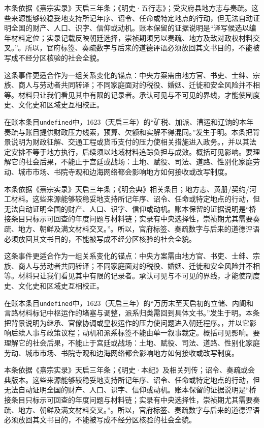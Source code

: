 本条依据《熹宗实录》天启三年条；《明史·五行志》；受灾府县地方志与奏疏。这些来源能够较稳妥地支持所记年序、诏令、任命或特定地点的行动，但无法自动证明全国的财产、人口、识字、信仰或动机。账本保留的证据说明是“译写候选以编年材料定位；实录记载反映朝廷选择，崇祯期须另以奏疏、地方及敌对政权材料交叉。”。所以，官府标签、奏疏数字与后来的道德评语必须放回其文书目的，不能被写成不经分区核验的社会全貌。

这条事件更适合作为一组关系变化的锚点：中央方案需由地方官、书吏、士绅、宗族、商人与劳动者共同转译；不同家庭面对的税役、婚姻、迁徙和安全风险并不相等。材料只让我们看见其中有限的记录者。承认可见与不可见的界线，才能使制度史、文化史和区域史互相校正。

在账本条目\texttt{undefined}中，1623（天启三年）的“矿税、加派、漕运和辽饷的本年奏疏与账目提供财政压力线索，预算、欠额和实解不得混同。”发生于明。本条把背景说明为财政征解、交通工程或货币支付的压力使相关措施进入政务。，并以其法定安排不等于地方执行，后续须以地域材料追踪负担与成效。概括可见影响。要理解它的社会后果，不能止于宫廷或战场：土地、赋役、司法、道路、性别化家庭劳动、城市市场、书院寺观和边海网络都会影响地方如何接收或改写制度。

本条依据《熹宗实录》天启三年条；《明会典》相关条目；地方志、黄册/契约/河工材料。这些来源能够较稳妥地支持所记年序、诏令、任命或特定地点的行动，但无法自动证明全国的财产、人口、识字、信仰或动机。账本保留的证据说明是“桥接条目只标示可回查的年度问题与材料链；实录有中央选择性，崇祯期尤其需要奏疏、地方、朝鲜及满文材料交叉。”。所以，官府标签、奏疏数字与后来的道德评语必须放回其文书目的，不能被写成不经分区核验的社会全貌。

这条事件更适合作为一组关系变化的锚点：中央方案需由地方官、书吏、士绅、宗族、商人与劳动者共同转译；不同家庭面对的税役、婚姻、迁徙和安全风险并不相等。材料只让我们看见其中有限的记录者。承认可见与不可见的界线，才能使制度史、文化史和区域史互相校正。

在账本条目\texttt{undefined}中，1623（天启三年）的“万历末至天启初的立储、内阁和言路材料标记中枢运作的堵塞与调整，派系归类需回到具体文书。”发生于明。本条把背景说明为继承、官僚协调或皇权运作的压力使问题进入朝廷程序。，并以它影响后续人事与政策议程；动机和派系标签不能由单一叙事裁定。概括可见影响。要理解它的社会后果，不能止于宫廷或战场：土地、赋役、司法、道路、性别化家庭劳动、城市市场、书院寺观和边海网络都会影响地方如何接收或改写制度。

本条依据《熹宗实录》天启三年条；《明史·本纪》及相关列传；诏令、奏疏或会典版本。这些来源能够较稳妥地支持所记年序、诏令、任命或特定地点的行动，但无法自动证明全国的财产、人口、识字、信仰或动机。账本保留的证据说明是“桥接条目只标示可回查的年度问题与材料链；实录有中央选择性，崇祯期尤其需要奏疏、地方、朝鲜及满文材料交叉。”。所以，官府标签、奏疏数字与后来的道德评语必须放回其文书目的，不能被写成不经分区核验的社会全貌。

